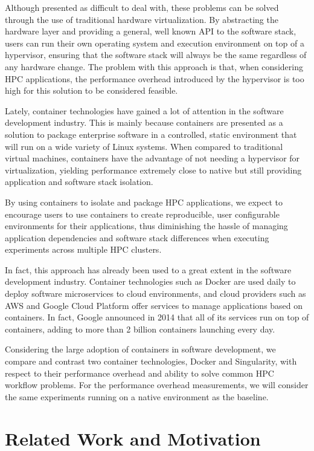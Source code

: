 \documentclass[12pt]{article}
\begin{document}
Although presented as difficult to deal with, these problems can be solved through the use of traditional hardware virtualization. By abstracting the hardware layer and providing a general, well known API to the software stack, users can run their own operating system and execution environment on top of a hypervisor, ensuring that the software stack will always be the same regardless of any hardware change. The problem with this approach is that, when considering HPC applications, the performance overhead introduced by the hypervisor is too high for this solution to be considered feasible.

Lately, container technologies have gained a lot of attention in the software development industry. This is mainly because containers are presented as a solution to package enterprise software in a controlled, static environment that will run on a wide variety of Linux systems. When compared to traditional virtual machines, containers have the advantage of not needing a hypervisor for virtualization, yielding performance extremely close to native but still providing application and software stack isolation. 

By using containers to isolate and package HPC applications, we expect to encourage users to use containers to create reproducible, user configurable environments for their applications, thus diminishing the hassle of managing application dependencies and software stack differences when executing experiments across multiple HPC clusters.

In fact, this approach has already been used to a great extent in the software development industry. Container technologies such as Docker are used daily to deploy software microservices to cloud environments, and cloud providers such as AWS and Google Cloud Platform offer services to manage applications based on containers. In fact, Google announced in 2014 that all of its services run on top of containers, adding to more than 2 billion containers launching every day.

Considering the large adoption of containers in software development, we compare and contrast two container technologies, Docker and Singularity, with respect to their performance overhead and ability to solve common HPC workflow problems. For the performance overhead measurements, we will consider the same experiments running on a native environment as the baseline.

\section{Related Work and Motivation}
\label{sec:orgc3cfd93}
\end{document}
